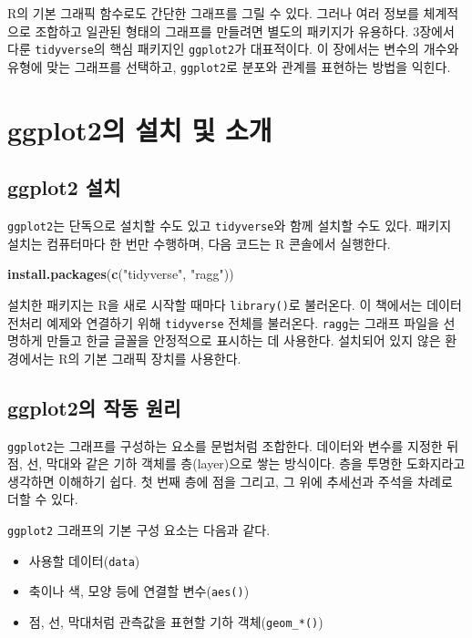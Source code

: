 \documentclass[
]{book}
\newenvironment{Shaded}{\begin{snugshade}}{\end{snugshade}}
\newcommand{\FunctionTok}[1]{\textcolor[rgb]{0.13,0.29,0.53}{\textbf{#1}}}
\newcommand{\NormalTok}[1]{#1}
\newcommand{\StringTok}[1]{\textcolor[rgb]{0.31,0.60,0.02}{#1}}
\providecommand{\tightlist}{%
  \setlength{\itemsep}{0pt}\setlength{\parskip}{0pt}}
\begin{document}
R의 기본 그래픽 함수로도 간단한 그래프를 그릴 수 있다. 그러나 여러 정보를 체계적으로 조합하고 일관된 형태의 그래프를 만들려면 별도의 패키지가 유용하다. 3장에서 다룬 \texttt{tidyverse}의 핵심 패키지인 \texttt{ggplot2}가 대표적이다. 이 장에서는 변수의 개수와 유형에 맞는 그래프를 선택하고, \texttt{ggplot2}로 분포와 관계를 표현하는 방법을 익힌다.

\section{ggplot2의 설치 및 소개}\label{ggplot2uxc758-uxc124uxce58-uxbc0f-uxc18cuxac1c}

\subsection{ggplot2 설치}\label{ggplot2-uxc124uxce58}

\texttt{ggplot2}는 단독으로 설치할 수도 있고 \texttt{tidyverse}와 함께 설치할 수도 있다. 패키지 설치는 컴퓨터마다 한 번만 수행하며, 다음 코드는 R 콘솔에서 실행한다.

\begin{Shaded}
\begin{Highlighting}[]
\FunctionTok{install.packages}\NormalTok{(}\FunctionTok{c}\NormalTok{(}\StringTok{"tidyverse"}\NormalTok{, }\StringTok{"ragg"}\NormalTok{))}
\end{Highlighting}
\end{Shaded}

설치한 패키지는 R을 새로 시작할 때마다 \texttt{library()}로 불러온다. 이 책에서는 데이터 전처리 예제와 연결하기 위해 \texttt{tidyverse} 전체를 불러온다. \texttt{ragg}는 그래프 파일을 선명하게 만들고 한글 글꼴을 안정적으로 표시하는 데 사용한다. 설치되어 있지 않은 환경에서는 R의 기본 그래픽 장치를 사용한다.

\subsection{ggplot2의 작동 원리}\label{ggplot2uxc758-uxc791uxb3d9-uxc6d0uxb9ac}

\texttt{ggplot2}는 그래프를 구성하는 요소를 문법처럼 조합한다. 데이터와 변수를 지정한 뒤 점, 선, 막대와 같은 기하 객체를 층(layer)으로 쌓는 방식이다. 층을 투명한 도화지라고 생각하면 이해하기 쉽다. 첫 번째 층에 점을 그리고, 그 위에 추세선과 주석을 차례로 더할 수 있다.

\texttt{ggplot2} 그래프의 기본 구성 요소는 다음과 같다.

\begin{itemize}
\tightlist
\item
  사용할 데이터(\texttt{data})
\item
  축이나 색, 모양 등에 연결할 변수(\texttt{aes()})
\item
  점, 선, 막대처럼 관측값을 표현할 기하 객체(\texttt{geom\_*()})
\end{itemize}
\end{document}
